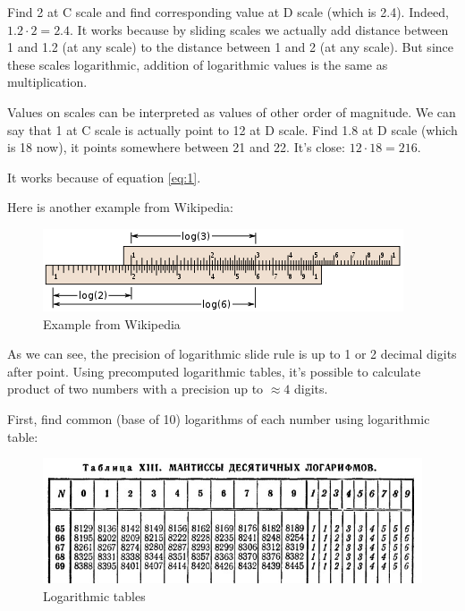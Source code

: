 
Find 2 at C scale and find corresponding value at D scale (which is 2.4).
Indeed, $1.2 \cdot 2 = 2.4$.
It works because by sliding scales we actually add distance between 1 and 1.2 (at any scale) to the distance between 1 and 2 (at any scale).
But since these scales logarithmic, addition of logarithmic values is the same as multiplication.

Values on scales can be interpreted as values of other order of magnitude.
We can say that 1 at C scale is actually point to 12 at D scale.
Find 1.8 at D scale (which is 18 now), it points somewhere between 21 and 22.
It's close: $12 \cdot 18 = 216$.

It works because of equation \ref{eq:1}.

Here is another example from Wikipedia:

\begin{figure}[H]
\centering
\includegraphics[scale=0.66]{log/403px-Slide_rule_example2_with_labels.png}
\caption{Example from Wikipedia}
\end{figure}


As we can see, the precision of logarithmic slide rule is up to 1 or 2 decimal digits after point.
Using precomputed logarithmic tables, it's possible to calculate product of two numbers with a precision up to $\approx 4$ digits.

First, find common (base of 10) logarithms of each number using logarithmic table:

\begin{figure}[H]
\centering
\includegraphics[scale=0.66]{log/bradis1.jpg}
\caption{Logarithmic tables}
\end{figure}

